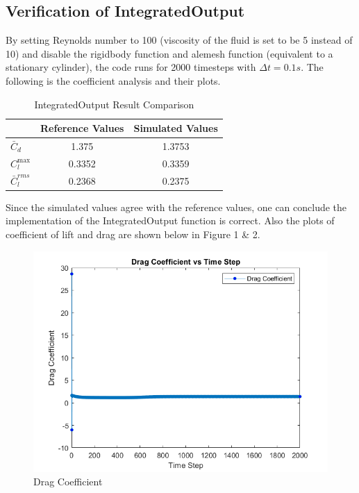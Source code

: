 \documentclass[a4paper,12pt]{article} %
\begin{document}
\subsection*{Verification of IntegratedOutput}
By setting Reynolds number to 100 (viscosity of the fluid is set to be 5 instead of 10) and disable the rigidbody function 
and alemesh function (equivalent to a stationary cylinder), the code runs for 2000 timesteps with $\varDelta  t =  0.1s$.
The following is the coefficient analysis and their plots.
\begin{table}[ht]
    \centering
    \caption{IntegratedOutput Result Comparison}
    \begin{tabular}{|l|c|c|}
      \hline
      \rule{0pt}{15pt}
       & Reference Values & Simulated Values \\
      \hline
      \rule{0pt}{15pt}
      $\bar C_d$ & 1.375 & 1.3753 \\
      \hline
      \rule{0pt}{15pt}
      $C_l^{\max}$ & 0.3352 & 0.3359 \\
      \hline
      \rule{0pt}{15pt}
      $\bar C_l^{rms}$ & 0.2368 & 0.2375 \\
      \hline
    \end{tabular}
  \end{table}
Since the simulated values agree with the reference values, one can conclude the implementation of the IntegratedOutput
function is correct. Also the plots of coefficient of lift and drag are shown below in Figure 1 \& 2.
\begin{figure}[htbp]
    \center
    \includegraphics[scale=0.6]{Cl.png}
    \caption{Drag Coefficient}
\end{figure}
\end{document}
